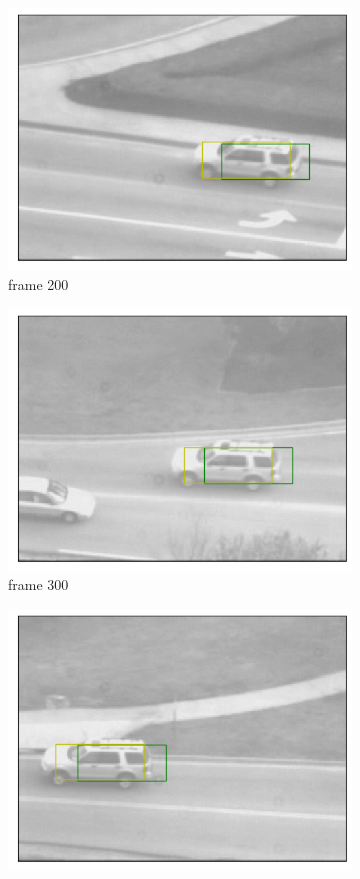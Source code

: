 \documentclass[11pt]{article}
\begin{document}
\begin{figure}[h!]
\begin{subfigure}{.195\textwidth}
      \includegraphics[width=.95\linewidth]{../results/carseqrects-wrct_199.png}
      \caption{frame 200}
    \end{subfigure}
    \begin{subfigure}{.195\textwidth}
      \centering
      \includegraphics[width=.95\linewidth]{../results/carseqrects-wrct_299.png}
      \caption{frame 300}
    \end{subfigure}
    \begin{subfigure}{.195\textwidth}
      \centering
      \includegraphics[width=.95\linewidth]{../results/carseqrects-wrct_399.png}

\end{subfigure}
\end{figure}
\end{document}
